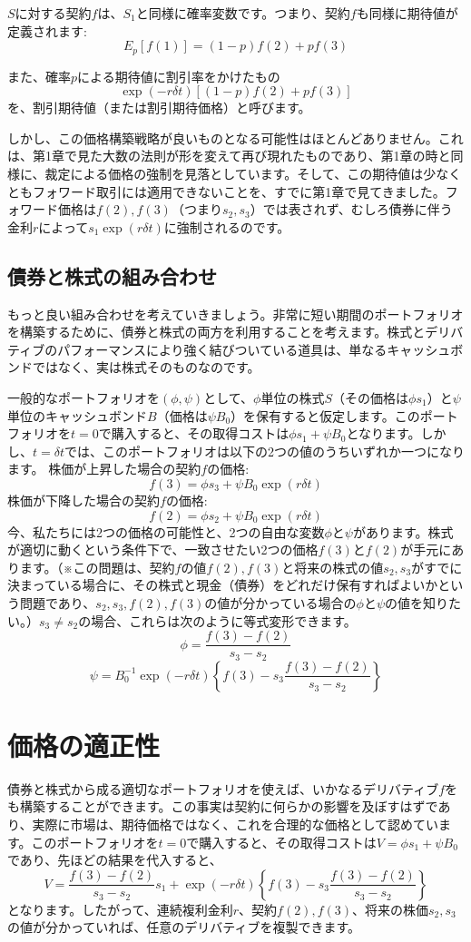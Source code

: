 \documentclass[uplatex,a4j,12pt,dvipdfmx]{jsarticle}
\begin{document}
$S$に対する契約$f$は、$S_1$と同様に確率変数です。つまり、契約$f$も同様に期待値が定義されます: \[E_p[f(1)] = (1-p)f(2) + pf(3)\]

また、確率$p$による期待値に割引率をかけたもの\[\exp(-r\delta t)[(1-p)f(2) + pf(3)]\]を、割引期待値（または割引期待価格）と呼びます。

しかし、この価格構築戦略が良いものとなる可能性はほとんどありません。これは、第1章で見た大数の法則が形を変えて再び現れたものであり、第1章の時と同様に、裁定による価格の強制を見落としています。そして、この期待値は少なくともフォワード取引には適用できないことを、すでに第1章で見てきました。フォワード価格は$f(2), f(3)$（つまり$s_2, s_3$）では表されず、むしろ債券に伴う金利$r$によって$s_1 \exp(r\delta t)$に強制されるのです。

\subsection{債券と株式の組み合わせ}
もっと良い組み合わせを考えていきましょう。非常に短い期間のポートフォリオを構築するために、債券と株式の両方を利用することを考えます。株式とデリバティブのパフォーマンスにより強く結びついている道具は、単なるキャッシュボンドではなく、実は株式そのものなのです。

一般的なポートフォリオを$(\phi, \psi)$として、$\phi$単位の株式$S$（その価格は$\phi s_1$）と$\psi$単位のキャッシュボンド$B$（価格は$\psi B_0$）を保有すると仮定します。このポートフォリオを$t=0$で購入すると、その取得コストは$\phi s_1 + \psi B_0$となります。しかし、$t=\delta t$では、このポートフォリオは以下の2つの値のうちいずれか一つになります。
株価が上昇した場合の契約$f$の価格: \[f(3) = \phi s_3 + \psi B_0\exp(r\delta t)\]
株価が下降した場合の契約$f$の価格: \[f(2) = \phi s_2 + \psi B_0\exp(r\delta t)\]
今、私たちには2つの価格の可能性と、2つの自由な変数$\phi$と$\psi$があります。株式が適切に動くという条件下で、一致させたい2つの価格$f(3)$と$f(2)$が手元にあります。（※この問題は、契約$f$の値$f(2), f(3)$と将来の株式の値$s_2, s_3$がすでに決まっている場合に、その株式と現金（債券）をどれだけ保有すればよいかという問題であり、$s_2, s_3, f(2), f(3)$の値が分かっている場合の$\phi$と$\psi$の値を知りたい。）$s_3 \neq s_2$の場合、これらは次のように等式変形できます。
\[\phi = \frac{f(3) - f(2)}{s_3 - s_2}\]
\[\psi = B_0^{-1} \exp(-r\delta t) \left\{ f(3) - s_3 \frac{f(3) - f(2)}{s_3 - s_2} \right\}\]

\section{価格の適正性}
債券と株式から成る適切なポートフォリオを使えば、いかなるデリバティブ$f$をも構築することができます。この事実は契約に何らかの影響を及ぼすはずであり、実際に市場は、期待価格ではなく、これを合理的な価格として認めています。このポートフォリオを$t=0$で購入すると、その取得コストは$V = \phi s_1 + \psi B_0$であり、先ほどの結果を代入すると、
\[V = \frac{f(3) - f(2)}{s_3 - s_2} s_1 + \exp(-r\delta t) \left\{ f(3) - s_3 \frac{f(3) - f(2)}{s_3 - s_2} \right\}\]
となります。したがって、連続複利金利$r$、契約$f(2), f(3)$、将来の株価$s_2, s_3$の値が分かっていれば、任意のデリバティブを複製できます。
\end{document}
